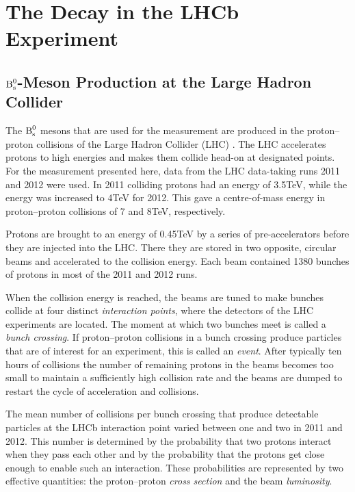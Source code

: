 \section{The \texorpdfstring{\BstoJpsiKK}{Bs0->J/psi K+K-} Decay in the LHCb Experiment}
\label{sec:intro_LHCb}

\subsection{\texorpdfstring{$\text{B}_\text{s}^\text{0}$}{Bs0}-Meson Production at the Large Hadron Collider}
\label{subsec:intro_LHCb_LHC}

The $\text{B}_\text{s}^\text{0}$ mesons that are used for the \BstoJpsiKK{} measurement are produced in the proton--proton collisions of the Large Hadron Collider
(LHC) \cite{Evans:2008zzb}. The LHC accelerates protons to high energies and makes them collide head-on at designated points. For the
measurement presented here, data from the LHC data-taking runs 2011 and 2012 were used. In 2011 colliding protons had an energy of
3.5\unitsp{}TeV, while the energy was increased to 4\unitsp{}TeV for 2012. This gave a centre-of-mass energy in proton--proton collisions
of 7 and 8\unitsp{}TeV, respectively.

Protons are brought to an energy of 0.45\unitsp{}TeV by a series of pre-accelerators before they are injected into the LHC. There they are
stored in two opposite, circular beams and accelerated to the collision energy. Each beam contained 1380 bunches of  protons in
most of the 2011 and 2012 runs.

When the collision energy is reached, the beams are tuned to make bunches collide at four distinct \emph{interaction points}, where the
detectors of the LHC experiments are located. The moment at which two bunches meet is called a \emph{bunch crossing}. If proton--proton
collisions in a bunch crossing produce particles that are of interest for an experiment, this is called an \emph{event}. After typically
ten hours of collisions the number of remaining protons in the beams becomes too small to maintain a sufficiently high collision rate and
the beams are dumped to restart the cycle of acceleration and collisions.

The mean number of collisions per bunch crossing that produce detectable particles at the LHCb interaction point varied between one and two
in 2011 and 2012. This number is determined by the probability that two protons interact when they pass each other and by the probability
that the protons get close enough to enable such an interaction. These probabilities are represented by two effective quantities: the
proton--proton \emph{cross section} and the beam \emph{luminosity}.

